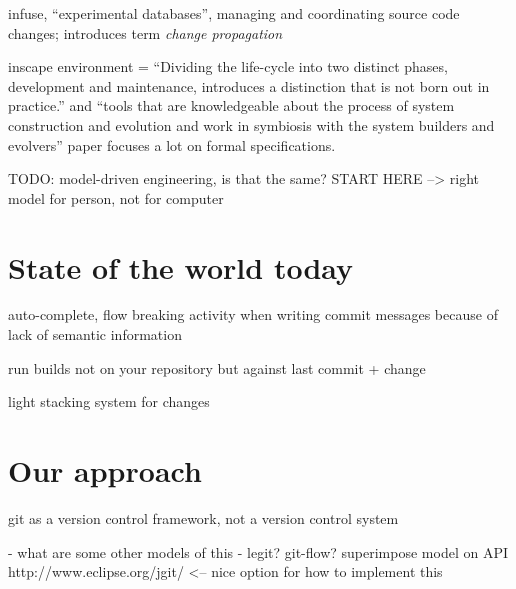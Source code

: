 \documentclass[conference]{IEEEtran}
\begin{document}
infuse, ``experimental databases'', managing and coordinating source code changes; introduces term \emph{change propagation}~\cite{Perry1987}

inscape environment = ``Dividing the life-cycle into two distinct phases, development and maintenance, introduces a distinction that is not born out in practice.'' and ``tools that are knowledgeable about the process of system construction and evolution and work in symbiosis with the system builders and evolvers'' paper focuses a lot on formal specifications.~\cite{Perry1989}






TODO: model-driven engineering, is that the same? START HERE
 --> right model for person, not for computer



\section{State of the world today}

auto-complete, flow breaking activity when writing commit messages because of lack of semantic information

run builds not on your repository but against last commit + change

light stacking system for changes

\section{Our approach}

git as a version control framework, not a version control system

- what are some other models of this
- legit? git-flow? superimpose model on API
http://www.eclipse.org/jgit/ <-- nice option for how to implement this
\end{document}
